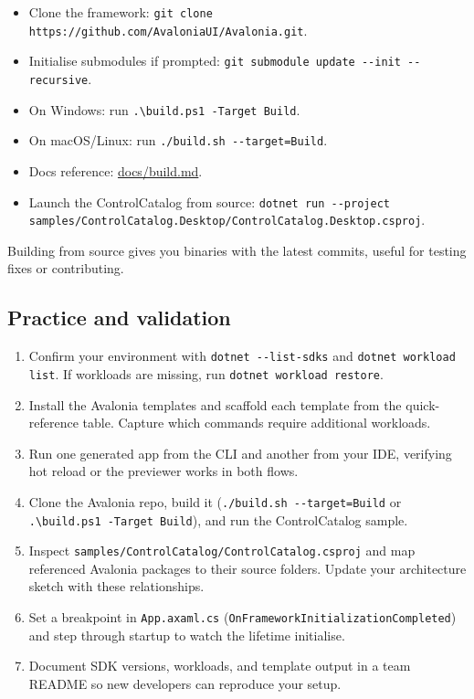 \begin{itemize}
\tightlist
\item
  Clone the framework:
  \passthrough{\lstinline!git clone https://github.com/AvaloniaUI/Avalonia.git!}.
\item
  Initialise submodules if prompted:
  \passthrough{\lstinline!git submodule update --init --recursive!}.
\item
  On Windows: run \passthrough{\lstinline!.\\build.ps1 -Target Build!}.
\item
  On macOS/Linux: run
  \passthrough{\lstinline!./build.sh --target=Build!}.
\item
  Docs reference:
  \href{https://github.com/AvaloniaUI/Avalonia/blob/master/docs/build.md}{docs/build.md}.
\item
  Launch the ControlCatalog from source:
  \passthrough{\lstinline!dotnet run --project samples/ControlCatalog.Desktop/ControlCatalog.Desktop.csproj!}.
\end{itemize}

Building from source gives you binaries with the latest commits, useful
for testing fixes or contributing.

\subsection{Practice and validation}\label{practice-and-validation}

\begin{enumerate}
\def\labelenumi{\arabic{enumi}.}
\tightlist
\item
  Confirm your environment with
  \passthrough{\lstinline!dotnet --list-sdks!} and
  \passthrough{\lstinline!dotnet workload list!}. If workloads are
  missing, run \passthrough{\lstinline!dotnet workload restore!}.
\item
  Install the Avalonia templates and scaffold each template from the
  quick-reference table. Capture which commands require additional
  workloads.
\item
  Run one generated app from the CLI and another from your IDE,
  verifying hot reload or the previewer works in both flows.
\item
  Clone the Avalonia repo, build it
  (\passthrough{\lstinline!./build.sh --target=Build!} or
  \passthrough{\lstinline!.\\build.ps1 -Target Build!}), and run the
  ControlCatalog sample.
\item
  Inspect
  \passthrough{\lstinline!samples/ControlCatalog/ControlCatalog.csproj!}
  and map referenced Avalonia packages to their source folders. Update
  your architecture sketch with these relationships.
\item
  Set a breakpoint in \passthrough{\lstinline!App.axaml.cs!}
  (\passthrough{\lstinline!OnFrameworkInitializationCompleted!}) and
  step through startup to watch the lifetime initialise.
\item
  Document SDK versions, workloads, and template output in a team README
  so new developers can reproduce your setup.
\end{enumerate}

